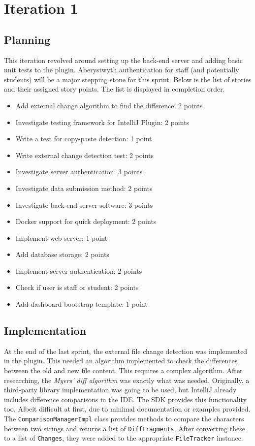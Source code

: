 \chapter{Iteration 1}
\label{it:1}
\section{Planning}
This iteration revolved around setting up the back-end server and adding basic unit tests to the plugin. Aberystwyth authentication for staff (and potentially students) will be a major stepping stone for this sprint. Below is the list of stories and their assigned story points. The list is displayed in completion order.

\begin{itemize}
\item Add external change algorithm to find the difference: 2 points
\item Investigate testing framework for IntelliJ Plugin: 2 points
\item Write a test for copy-paste detection: 1 point
\item Write external change detection test: 2 points
\item Investigate server authentication: 3 points
\item Investigate data submission method: 2 points
\item Investigate back-end server software: 3 points
\item Docker support for quick deployment: 2 points
\item Implement web server: 1 point
\item Add database storage: 2 points
\item Implement server authentication: 2 points
\item Check if user is staff or student: 2 points
\item Add dashboard bootstrap template: 1 point
\end{itemize}

\section{Implementation}
At the end of the last sprint, the external file change detection was implemented in the plugin. This needed an algorithm implemented to check the differences between the old and new file content. This requires a complex algorithm. After researching, the \textit{Myers' diff algorithm} was exactly what was needed. Originally, a third-party library implementation was going to be used, but IntelliJ already includes difference comparisons in the IDE. The SDK provides this functionality too. Albeit difficult at first, due to minimal documentation or examples provided. The \texttt{ComparisonManagerImpl} class provides methods to compare the characters between two strings and returns a list of \texttt{DiffFragments}. After converting these to a list of \texttt{Changes}, they were added to the appropriate \texttt{FileTracker} instance.

